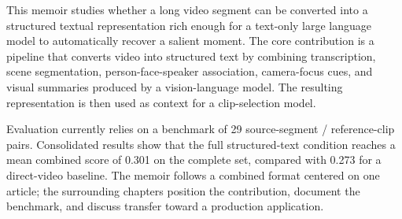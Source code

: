 This memoir studies whether a long video segment can be converted into a structured textual representation rich enough for a text-only large language model to automatically recover a salient moment. The core contribution is a pipeline that converts video into structured text by combining transcription, scene segmentation, person-face-speaker association, camera-focus cues, and visual summaries produced by a vision-language model. The resulting representation is then used as context for a clip-selection model.

Evaluation currently relies on a benchmark of 29 source-segment / reference-clip pairs. Consolidated results show that the full structured-text condition reaches a mean combined score of 0.301 on the complete set, compared with 0.273 for a direct-video baseline. The memoir follows a combined format centered on one article; the surrounding chapters position the contribution, document the benchmark, and discuss transfer toward a production application.
